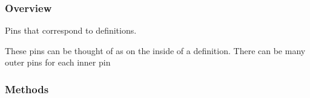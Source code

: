 \documentclass[letterpaper,10pt,english,openany,oneside]{sphinxmanual}
\begin{document}
\subsubsection{Overview}
\label{\detokenize{reference/classes/innerpin:overview}}

\begin{fulllineitems}
\label{\detokenize{reference/classes/innerpin:spydrnet.InnerPin}}
Pins that correspond to definitions.

These pins can be thought of as on the inside of a definition. There can be
many outer pins for each inner pin

\end{fulllineitems}



\subsubsection{Methods}
\label{\detokenize{reference/classes/innerpin:methods}}
\end{document}
